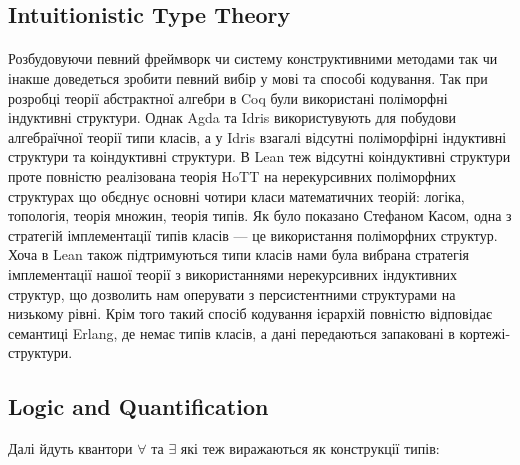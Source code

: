 \documentclass[11pt,oneside]{article}
\begin{document}

\newpage
   \subsection{Intuitionistic Type Theory}

   \paragraph{}
   Розбудовуючи певний фреймворк чи систему конструктивними методами
   так чи інакше доведеться зробити певний вибір у мові та способі кодування.
   Так при розробці теорії абстрактної алгебри в Coq були використані
   поліморфні індуктивні структури\cite{coqalg}. Однак Agda та Idris використувують
   для побудови алгебраїчної теорії типи класів, а у Idris взагалі відсутні
   поліморфірні індуктивні структури та коіндуктивні структури. В Lean
   теж відсутні коіндуктивні структури проте повністю реалізована теорія
   HoTT на нерекурсивних поліморфних структурах що обєднує основні чотири
   класи математичних теорій: логіка, топологія, теорія множин, теорія типів.
   Як було показано Стефаном Касом\cite{kaes}, одна з
   стратегій імплементації типів класів --- це використання поліморфних структур.
   Хоча в Lean також підтримуються типи класів нами була вибрана стратегія
   імплементації нашої теорії з використаннями нерекурсивних індуктивних структур,
   що дозволить нам оперувати з персистентними структурами на низькому рівні.
   Крім того такий спосіб кодування ієрархій повністю відповідає семантиці Erlang,
   де немає типів класів, а дані передаються запаковані в кортежі-структури.

  \subsection{Logic and Quantification}

Далі йдуть квантори $\forall$ та $\exists$ які теж виражаються як конструкції типів:
\end{document}
